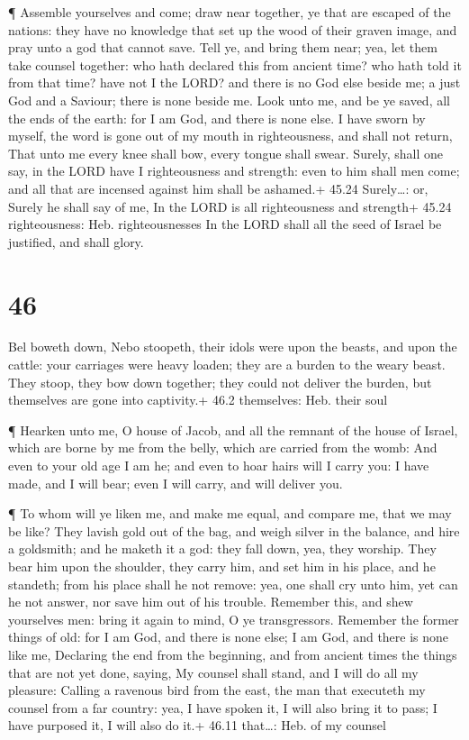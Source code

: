  ¶ Assemble yourselves and come; draw near together, ye
that are escaped of the nations: they have no knowledge that set up the
wood of their graven image, and pray unto a god that cannot save.
 Tell ye, and bring them near; yea, let them take counsel
together: who hath declared this from ancient time? who hath told it
from that time? have not I the LORD? and there is no God else beside me;
a just God and a Saviour; there is none beside me.  Look
unto me, and be ye saved, all the ends of the earth: for I am God, and
there is none else.  I have sworn by myself, the word is
gone out of my mouth in righteousness, and shall not return, That unto
me every knee shall bow, every tongue shall swear.  Surely,
shall one say, in the LORD have I righteousness and strength: even to
him shall men come; and all that are incensed against him shall be
ashamed.+ 45.24 Surely\ldots: or, Surely he shall say of me, In the LORD
is all righteousness and strength+ 45.24 righteousness: Heb.
righteousnesses  In the LORD shall all the seed of Israel
be justified, and shall glory.

\hypertarget{section-45}{%
\section{46}\label{section-45}}

 Bel boweth down, Nebo stoopeth, their idols were upon the
beasts, and upon the cattle: your carriages were heavy loaden; they are
a burden to the weary beast.  They stoop, they bow down
together; they could not deliver the burden, but themselves are gone
into captivity.+ 46.2 themselves: Heb. their soul

 ¶ Hearken unto me, O house of Jacob, and all the remnant of
the house of Israel, which are borne by me from the belly, which are
carried from the womb:  And even to your old age I am he;
and even to hoar hairs will I carry you: I have made, and I will bear;
even I will carry, and will deliver you.

 ¶ To whom will ye liken me, and make me equal, and compare
me, that we may be like?  They lavish gold out of the bag,
and weigh silver in the balance, and hire a goldsmith; and he maketh it
a god: they fall down, yea, they worship.  They bear him
upon the shoulder, they carry him, and set him in his place, and he
standeth; from his place shall he not remove: yea, one shall cry unto
him, yet can he not answer, nor save him out of his trouble.
 Remember this, and shew yourselves men: bring it again to
mind, O ye transgressors.  Remember the former things of
old: for I am God, and there is none else; I am God, and there is none
like me,  Declaring the end from the beginning, and from
ancient times the things that are not yet done, saying, My counsel shall
stand, and I will do all my pleasure:  Calling a ravenous
bird from the east, the man that executeth my counsel from a far
country: yea, I have spoken it, I will also bring it to pass; I have
purposed it, I will also do it.+ 46.11 that\ldots: Heb. of my counsel

